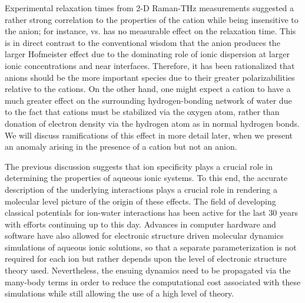 \documentclass[11pt, proquest]{uwthesis}[2020/02/24]
\let\ce\ch
\begin{document}
\par Experimental relaxation times from 2-D Raman-THz measurements suggested a rather strong correlation to the properties of the cation while being insensitive to the anion; for instance, \ce{SrCl2} vs. \ce{SrBr2} has no measurable effect on the relaxation time.\autocite{shalit_terahertz_2017} This is in direct contrast to the conventional wisdom that the anion produces the larger Hofmeister effect due to the dominating role of ionic dispersion at larger ionic concentrations and near interfaces.\autocite{bostrom_why_2004,jungwirth_molecular_2001,jungwirth_ions_2002,dang_molecular_2002,garrett_ions_2004} Therefore, it has been rationalized that anions should be the more important species due to their greater polarizabilities relative to the cations.\autocite{yang_hofmeister_2009} On the other hand, one might expect a cation to have a much greater effect on the surrounding hydrogen-bonding network of water due to the fact that cations must be stabilized via the oxygen atom, rather than donation of electron density via the hydrogen atom as in normal hydrogen bonds.\autocite{kwan_effect_2019} We will discuss ramifications of this effect in more detail later, when we present an anomaly arising in the presence of a cation but not an anion.

\par The previous discussion suggests that ion specificity plays a crucial role in determining the properties of aqueous ionic systems. To this end, the accurate description of the underlying interactions plays a crucial role in rendering a molecular level picture of the origin of these effects. The field of developing classical potentials for ion-water interactions has been active for the last 30 years\autocite{probst_molecular_1985,limtrakul_solvent_1985,probst_study_1987,amira_molecular_2004,wick_computational_2009,wick_molecular_2008} with efforts continuing up to this day.\autocite{arismendi-arrieta_i-ttm_2015,bajaj_toward_2016,riera_i-ttm_2016} Advances in computer hardware and software have also allowed for electronic structure driven molecular dynamics\autocite{car_unified_1985,kuhne_second_2014} simulations of aqueous ionic solutions,\autocite{todorova_carparrinello_2008,bako_carparrinello_2002,bankura_hydration_2013,baer_local_2016,duignan_quantifying_2020} so that a separate parameterization is not required for each ion but rather depends upon the level of electronic structure theory used. Nevertheless, the ensuing dynamics need to be propagated via the many-body terms in order to reduce the computational cost associated with these simulations while still allowing the use of a high level of theory.\autocite{liu_hydrogen-bond_2018,liu_variational_2019} 
\end{document}
